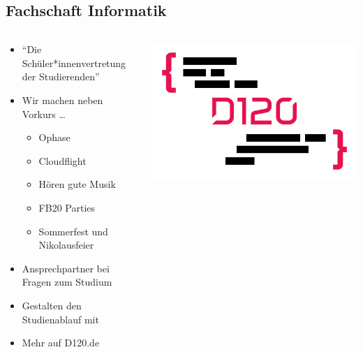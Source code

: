 \subsection*{Fachschaft Informatik}
\begin{frame}
    \slidehead
    \begin{columns}[b]
        \begin{column}{ .6\textwidth }
            \begin{itemize}[<+->]
                \item \enquote{Die Schüler*innenvertretung der Studierenden}
                \item Wir machen neben Vorkurs \dots
                    \begin{itemize}
                        \item Ophase
                        \item Cloudflight
                        \item Hören gute Musik
                        \item FB20 Parties
                        \item Sommerfest und Nikolausfeier
                    \end{itemize}
                \item Ansprechpartner bei Fragen zum Studium
                \item Gestalten den Studienablauf mit
                    \vspace{.4cm}
                \item {\centering \huge Mehr auf D120.de}
            \end{itemize}
        \end{column}%
        \begin{column}{ .4\textwidth }
            \includegraphics[width=\textwidth]{media/bildmarke_ohne_rand.png}
        \end{column}
    \end{columns}
\end{frame}

